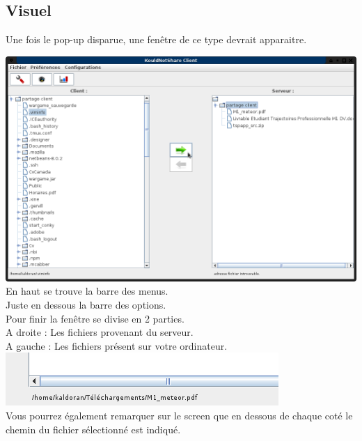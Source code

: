 \documentclass[12pt,a4paper]{article}
\begin{document}
\subsection{Visuel}
Une fois le pop-up disparue, une fenêtre de ce type devrait apparaitre.

\begin{center}
	\includegraphics[scale=0.4]{images/envoi.png} \\
	En haut se trouve la barre des menus. \\
	Juste en dessous la barre des options. \\
	
	Pour finir la fenêtre se divise en 2 parties. \\
	A droite : Les fichiers provenant du serveur. \\
	A gauche : Les fichiers présent sur votre ordinateur. \\
	
	\includegraphics[scale=0.4]{images/chemin.png} \\
	Vous pourrez également remarquer sur le screen que en dessous de chaque coté le chemin du fichier sélectionné est indiqué.

\end{center}
\end{document}
